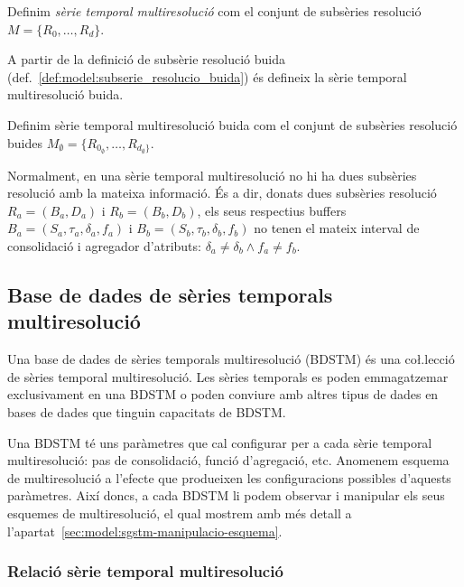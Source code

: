\begin{definition}
  Definim \emph{sèrie temporal multiresolució} com el conjunt de subsèries
  resolució $M=\{R_0,\dotsc,R_d\}$.
\end{definition}

A partir de la definició de subsèrie resolució buida
(def.~\ref{def:model:subserie_resolucio_buida}) és defineix la sèrie
temporal multiresolució buida.
 
\begin{definition}\label{def:model:st_multiresolucio_buit}
  Definim sèrie temporal multiresolució buida com el conjunt de subsèries
  resolució buides
  $M_{\emptyset}=\{R_{0_{\emptyset}},\dotsc,R_{d_{\emptyset}\}}$.
\end{definition}

Normalment, en una sèrie temporal multiresolució no hi ha dues subsèries
resolució amb la mateixa informació. És a dir, donats dues subsèries
resolució $R_a = (B_a, D_a)$ i $R_b = (B_b, D_b)$, els seus respectius
buffers $B_a=(S_a,\tau_a,\delta_a,f_a)$ i
$B_b=(S_b,\tau_b,\delta_b,f_b)$ no tenen el mateix interval de
consolidació i agregador d'atributs: $\delta_a \neq \delta_b \wedge
f_a \neq f_b$.




\subsection{Base de dades de sèries temporals
  multiresolució}\label{sec:model:bdstm}

Una base de dades de sèries temporals multiresolució (BDSTM) és una
co\l.lecció de sèries temporal multiresolució.  Les sèries temporals
es poden emmagatzemar exclusivament en una BDSTM o poden conviure amb
altres tipus de dades en bases de dades que tinguin capacitats de
BDSTM.


Una BDSTM té uns paràmetres que cal configurar per a cada sèrie
temporal multiresolució: pas de consolidació, funció d'agregació,
etc. Anomenem esquema de multiresolució a l'efecte que produeixen les
configuracions possibles d'aquests paràmetres. Així doncs, a cada
BDSTM li podem observar i manipular els seus esquemes de
multiresolució, el qual mostrem amb més detall a
l'apartat~\ref{sec:model:sgstm-manipulacio-esquema}.



\subsubsection{Relació sèrie temporal multiresolució}


